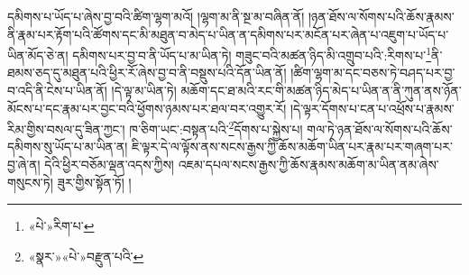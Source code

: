 དམིགས་པ་ཡོད་པ་ཞེས་བྱ་བའི་ཚིག་ལྷག་མའོ། །ལྷག་མ་ནི་སྔ་མ་བཞིན་ནོ། །ཉན་ཐོས་ལ་སོགས་པའི་ཆོས་རྣམས་ནི་རྣམ་པར་རྟོག་པའི་ཚོགས་དང་མི་མཐུན་བ་མེད་པ་ཡིན་ན་དམིགས་པར་མངོན་པར་ཞེན་པ་འཇུག་པ་ཡོད་པ་ཡིན་མོད་ཅེ་ན། དམིགས་པར་བྱ་བ་ནི་ཡོད་པ་མ་ཡིན་ཏེ། གཟུང་བའི་མཚན་ཉིད་མི་འགྲུབ་པའི་:རིགས་པ་\footnote{«པེ་»རིག་པ་}ནི་ཐམས་ཅད་དུ་མཐུན་པའི་ཕྱིར་རོ་ཞེས་བྱ་བ་ནི་བསྡུས་པའི་དོན་ཡིན་ནོ། །ཚིག་ལྷག་མ་དང་བཅས་ཏེ་བཤད་པར་བྱ་བ་འདི་ནི་ངེས་པ་ཡིན་ནོ། །དེ་ལྟ་མ་ཡིན་ཏེ། མཆོག་དང་ཐ་མའི་རང་གི་མཚན་ཉིད་མེད་པ་ཡིན་ན་ནི་ཀུན་ནས་ཉོན་མོངས་པ་དང་རྣམ་པར་བྱང་བའི་ཕྱོགས་ཉམས་པར་ཐལ་བར་འགྱུར་རོ། །དེ་ལྟར་དོགས་པ་ངན་པ་འཕྲོས་པ་རྣམས་རིམ་གྱིས་བསལ་དུ་ཟིན་ཀྱང་། ཁ་ཅིག་ཡང་:བསྟན་པའི་\footnote{«སྣར་»«པེ་»བརྫུན་པའི་}དོགས་པ་སྐྱེས་པ། གལ་ཏེ་ཉན་ཐོས་ལ་སོགས་པའི་ཆོས་དམིགས་སུ་ཡོད་པ་མ་ཡིན་ན། ཇི་ལྟར་དེ་ལ་ལྟོས་ནས་སངས་རྒྱས་ཀྱི་ཆོས་མཆོག་ཡིན་པར་རྣམ་པར་གཞག་པར་བྱ་ཞེ་ན། དེའི་ཕྱིར་བཅོམ་ལྡན་འདས་ཀྱིས། འཇམ་དཔལ་སངས་རྒྱས་ཀྱི་ཆོས་རྣམས་མཆོག་མ་ཡིན་ནམ་ཞེས་གསུངས་ཏེ། ཟུར་གྱིས་སྟོན་ཏོ། །
